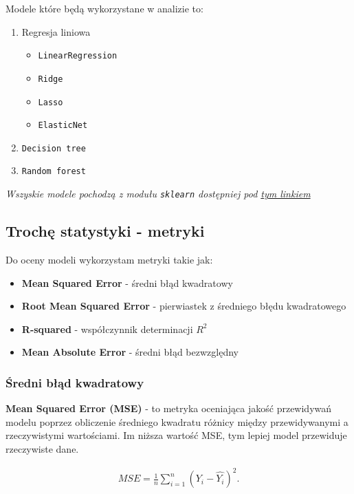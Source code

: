 \documentclass[a4paper]{article}
\begin{document}
\quad Modele które będą wykorzystane w analizie to:

\begin{enumerate}
    \item Regresja liniowa
          \begin{itemize}
              \item \texttt{LinearRegression}
              \item \texttt{Ridge}
              \item \texttt{Lasso}
              \item \texttt{ElasticNet}
          \end{itemize}
    \item \texttt{Decision tree}
    \item \texttt{Random forest}
\end{enumerate}

\textit{Wszyskie modele pochodzą z modułu \texttt{sklearn} dostępniej pod \href{https://scikit-learn.org/stable/}{tym linkiem}}

\subsection{Trochę statystyki - metryki}

\quad Do oceny modeli wykorzystam metryki takie jak:

\begin{itemize}
    \item \textbf{Mean Squared Error} - średni błąd kwadratowy
    \item \textbf{Root Mean Squared Error} - pierwiastek z średniego błędu kwadratowego
    \item \textbf{R-squared} - współczynnik determinacji $R^2$
    \item \textbf{Mean Absolute Error} - średni błąd bezwzględny
\end{itemize}

\subsubsection{Średni błąd kwadratowy}

\quad \textbf{Mean Squared Error (MSE)} - to metryka oceniająca jakość przewidywań modelu poprzez obliczenie średniego kwadratu różnicy między przewidywanymi a rzeczywistymi wartościami. Im niższa wartość MSE, tym lepiej model przewiduje rzeczywiste dane.

\begin{align}
    {MSE} ={\frac {1}{n}}\sum _{i=1}^{n}\left(Y_{i}-{\hat {Y_{i}}}\right)^{2}.
\end{align}
\end{document}
